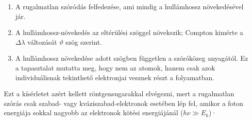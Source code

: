 \documentclass[a4paper,12pt]{article}
\begin{document}
\begin{enumerate}
    \item A rugalmatlan szóródás felfedezése, ami mindig a hullámhossz növekedésével jár.
    \item A hullámhossz-növekedés az eltérülési szöggel növekszik; Compton kimérte a $\Delta \lambda$ változását $\vartheta$ szög szerint.
    \item A hullámhossz növekedése adott szögben független a szóróközeg anyagától. Ez a tapasztalat mutatta meg, hogy nem az atomok, hanem csak azok individuálisnak tekinthető elektronjai vesznek részt a folyamatban.
\end{enumerate}
Ezt a kísérletet azért kellett röntgensugarakkal elvégezni, mert a rugalmatlan szórás csak szabad- vagy kváziszabad-elektronok esetében lép fel,
amikor a foton energiája sokkal nagyobb az elektronok kötési energiájánál ($h \nu \gg E_k$)·
\end{document}
